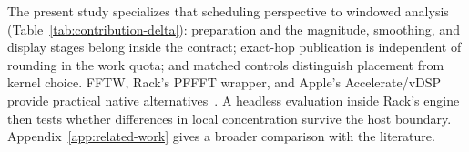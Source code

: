 

The present study specializes that scheduling perspective to windowed
analysis (Table~\ref{tab:contribution-delta}): preparation and the
magnitude, smoothing, and display stages belong inside the contract;
exact-hop publication is independent of rounding in the work quota; and
matched controls distinguish placement from kernel choice. FFTW, Rack's
PFFFT wrapper, and Apple's Accelerate/vDSP provide practical native
alternatives~\cite{frigo2005,pffft,vdsp}. A headless evaluation inside Rack's
engine then tests whether differences in local concentration survive the host
boundary. Appendix~\ref{app:related-work} gives a broader comparison with the
literature.
